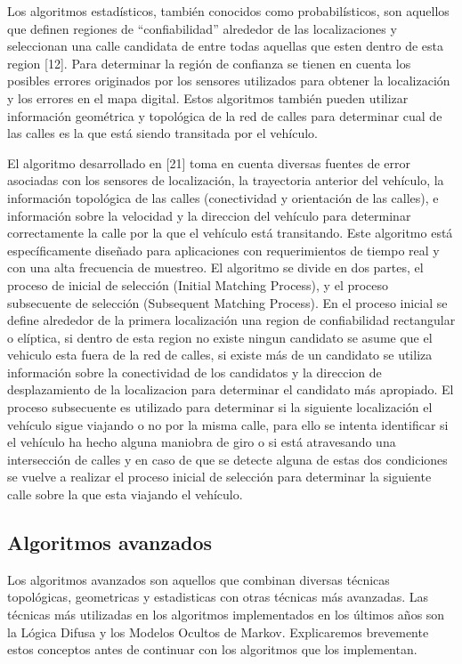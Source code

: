 \documentclass[final,fmstyle]{fpunathesis}
\begin{document}
Los algoritmos estadísticos, también conocidos como probabilísticos, son aquellos que definen regiones de “confiabilidad” alrededor de las localizaciones y seleccionan una calle candidata de entre todas aquellas que esten dentro de esta region [12]. Para determinar la región de confianza se tienen en cuenta los posibles errores originados por los sensores utilizados para obtener la localización y los errores en el mapa digital. Estos algoritmos también pueden utilizar información geométrica y topológica de la red de calles para determinar cual de las calles es la que está siendo transitada por el vehículo.

El algoritmo desarrollado en [21] toma en cuenta diversas fuentes de error asociadas con los sensores de localización, la trayectoria anterior del vehículo, la información topológica de las calles (conectividad y orientación de las calles), e información sobre la velocidad y la direccion del vehículo para determinar correctamente la calle por la que el vehículo está transitando. Este algoritmo está específicamente diseñado para aplicaciones con requerimientos de tiempo real y con una alta frecuencia de muestreo. El algoritmo se divide en dos partes, el proceso de inicial de selección (Initial Matching Process), y el proceso subsecuente de selección (Subsequent Matching Process). En el proceso inicial se define alrededor de la primera localización una region de confiabilidad rectangular o elíptica, si dentro de esta region no existe ningun candidato se asume que el vehiculo esta fuera de la red de calles, si existe más de un candidato se utiliza información sobre la conectividad de los candidatos y la direccion de desplazamiento de la localizacion para determinar el candidato más apropiado. El proceso subsecuente es utilizado para determinar si la siguiente localización el vehículo sigue viajando o no por la misma calle, para ello se intenta identificar si el vehículo ha hecho alguna maniobra de giro o si está atravesando una intersección de calles y en caso de que se detecte alguna de estas dos condiciones se vuelve a realizar el proceso inicial de selección para determinar la siguiente calle sobre la que esta viajando el vehículo.

\subsection{Algoritmos avanzados}

Los algoritmos avanzados son aquellos que combinan diversas técnicas topológicas, geometricas y estadisticas con otras técnicas más avanzadas. Las técnicas más utilizadas en los algoritmos implementados en los últimos años son la Lógica Difusa y los Modelos Ocultos de Markov. Explicaremos brevemente estos conceptos antes de continuar con los algoritmos que los implementan.
\end{document}
